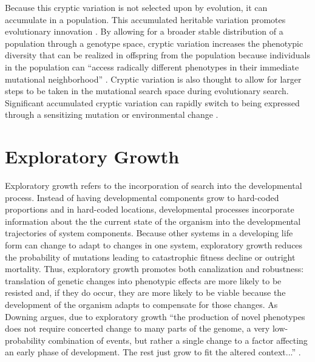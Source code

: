 Because this cryptic variation is not selected upon by evolution, it can accumulate in a population. This accumulated heritable variation promotes evolutionary innovation \cite{Wilder2015ReconcilingEvolvability}. By allowing for a broader stable distribution of a population through a genotype space, cryptic variation increases the phenotypic diversity that can be realized in offspring from the population because individuals in the population can ``access radically different phenotypes in their immediate mutational neighborhood'' \cite{Wilder2015ReconcilingEvolvability}. Cryptic variation is also thought to allow for larger steps to be taken in the mutational search space during evolutionary search. Significant accumulated cryptic variation can rapidly switch to being expressed through a sensitizing mutation or environmental change \cite{Moczek2011TheInnovation}.
        
\section{Exploratory Growth}
Exploratory growth refers to the incorporation of search into the developmental process. Instead of having developmental components grow to hard-coded proportions and in hard-coded locations, developmental processes incorporate information about the the current state of the organism into the developmental trajectories of system components. Because other systems in a developing life form can change to adapt to changes in one system, exploratory growth reduces the probability of mutations leading to catastrophic fitness decline or outright mortality. Thus, exploratory growth promotes both canalization and robustness: translation of genetic changes into phenotypic effects are more likely to be resisted and, if they do occur, they are more likely to be viable because the development of the organism adapts to compensate for those changes. As Downing argues, due to exploratory growth ``the production of novel phenotypes does not require concerted change to many parts of the genome, a very low-probability combination of events, but rather a single change to a factor affecting an early phase of development. The rest just grow to fit the altered context...'' \cite[p 214]{Downing2015IntelligenceSystems}.

